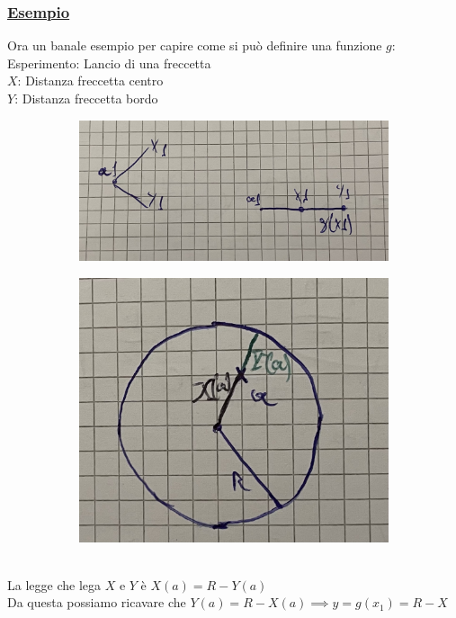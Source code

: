 \documentclass{article}
\begin{document}
\subsubsection{\underline{Esempio}}
Ora un banale esempio per capire come si può definire una funzione $g$: \\
Esperimento: Lancio di una freccetta \\
$X$: Distanza freccetta centro \\
$Y$: Distanza freccetta bordo 
\newpage
\begin{figure}[ht]
  \begin{subfigure}{.5\textwidth}
  \centering
    \includegraphics[width=.9\linewidth]{images/39.Esempio1Trasf1.jpeg}
  \end{subfigure}
  \begin{subfigure}{.5\textwidth}
  \centering
    \includegraphics[width=.9\linewidth]{images/40.Esempio1Trasf2.jpeg}
  \end{subfigure}
\end{figure} ~\\
La legge che lega $X$ e $Y$ è $X(a) = R - Y(a)$ \\
Da questa possiamo ricavare che $Y(a) = R - X(a) \implies y = g(x_1) = R-X$
\end{document}

